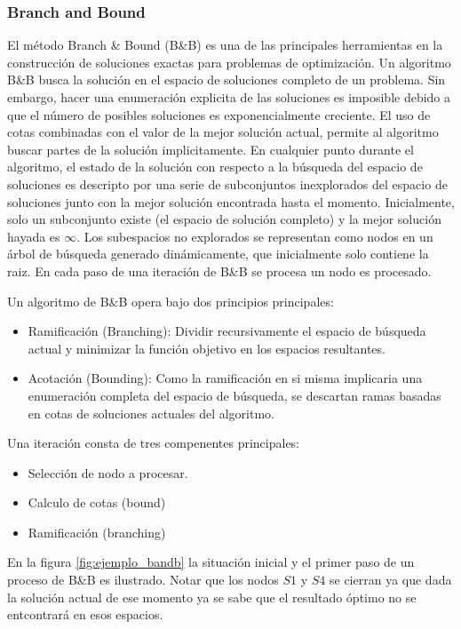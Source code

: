 \documentclass[10pt, a4paper]{article}
\theoremstyle{definition}
\begin{document}
\subsubsection{Branch and Bound}
El método Branch \& Bound (B\&B) es una de las principales herramientas en la construcción de soluciones exactas para problemas de optimización.
Un algoritmo B\&B busca la solución en el espacio de soluciones completo de un problema.
Sin embargo, hacer una enumeración explicita de las soluciones es imposible debido a que el número de posibles soluciones es exponencialmente creciente.
El uso de cotas combinadas con el valor de la mejor solución actual, permite al algoritmo buscar partes de la solución implicitamente.
En cualquier punto durante el algoritmo, el estado de la solución con respecto a la búsqueda del espacio de soluciones es descripto por una serie de subconjuntos inexplorados del espacio de soluciones junto con la mejor solución encontrada hasta el momento.
Inicialmente, solo un subconjunto existe (el espacio de solución completo) y la mejor solución hayada es $\infty$. 
Los subespacios no explorados se representan como nodos en un árbol de búsqueda generado dinámicamente, que inicialmente solo contiene la raiz. 
En cada paso de una iteración de B\&B se procesa un nodo es procesado.

Un algoritmo de B\&B opera bajo dos principios principales:
\begin{itemize}
  \item Ramificación (Branching): Dividir recursivamente el espacio de búsqueda actual y minimizar la función objetivo en los espacios resultantes.
  \item Acotación (Bounding): Como la ramificación en si misma implicaria una enumeración completa del espacio de búsqueda, se descartan ramas basadas en cotas de soluciones actuales del algoritmo.
\end{itemize}
 Una iteración consta de tres compenentes principales:
 \begin{itemize}
  \item Selección de nodo a procesar.
  \item Calculo de cotas (bound)
  \item Ramificación (branching)
 \end{itemize}

 En la figura \ref{fig:ejemplo_bandb} la situación inicial y el primer paso de un proceso de B\&B es ilustrado. Notar que los nodos $S1$ y $S4$ se cierran ya que dada la solución actual de ese momento ya se sabe que el resultado óptimo no se entcontrará en esos espacios.
\end{document}
